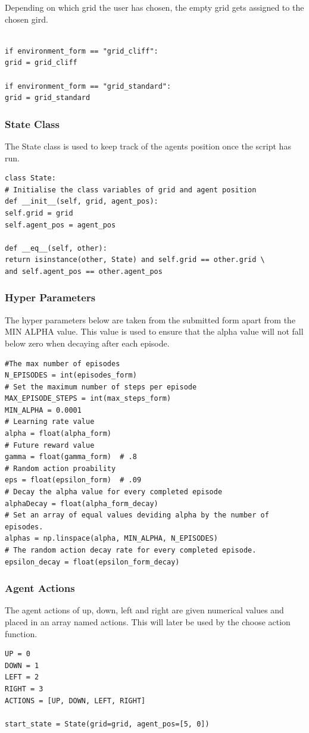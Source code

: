 Depending on which grid the user has chosen, the empty grid gets assigned to the chosen gird.
\begin{verbatim}

if environment_form == "grid_cliff":
grid = grid_cliff

if environment_form == "grid_standard":
grid = grid_standard
\end{verbatim}
\subsubsection{State Class}
The State class is used to keep track of the agents position once the script has run.
\begin{verbatim}
class State:
# Initialise the class variables of grid and agent position
def __init__(self, grid, agent_pos):
self.grid = grid
self.agent_pos = agent_pos

def __eq__(self, other):
return isinstance(other, State) and self.grid == other.grid \
and self.agent_pos == other.agent_pos
\end{verbatim}
\subsubsection{Hyper Parameters}
The hyper parameters below are taken from the submitted form apart from the MIN ALPHA value. This value is used to ensure that the alpha value will not fall below zero when decaying after each episode.
\begin{verbatim}
#The max number of episodes
N_EPISODES = int(episodes_form)
# Set the maximum number of steps per episode
MAX_EPISODE_STEPS = int(max_steps_form)
MIN_ALPHA = 0.0001
# Learning rate value
alpha = float(alpha_form)
# Future reward value
gamma = float(gamma_form)  # .8
# Random action proability
eps = float(epsilon_form)  # .09
# Decay the alpha value for every completed episode
alphaDecay = float(alpha_form_decay)
# Set an array of equal values deviding alpha by the number of episodes.
alphas = np.linspace(alpha, MIN_ALPHA, N_EPISODES)
# The random action decay rate for every completed episode.
epsilon_decay = float(epsilon_form_decay)
\end{verbatim}
\subsubsection{Agent Actions}
The agent actions of up, down, left and right are given numerical values and placed in an array named actions. This will later be used by the choose action function.
\begin{verbatim}
UP = 0
DOWN = 1
LEFT = 2
RIGHT = 3
ACTIONS = [UP, DOWN, LEFT, RIGHT]

start_state = State(grid=grid, agent_pos=[5, 0])
\end{verbatim}
